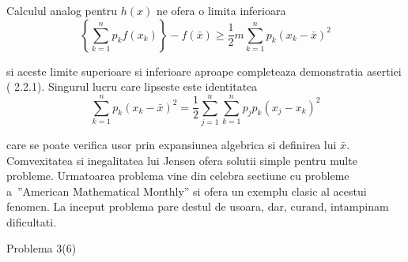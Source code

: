 \documentclass[a4paper,12pt,oneside]{report}
\begin{document}
	Calculul analog pentru  \(h\left ( x \right )\) ne ofera o limita inferioara 
\begin{displaymath}
  \left \{ \sum_{k = 1}^{n} p_{k}f\left ( x_{k} \right )\right \} - f\left (\bar{x}  \right )\geq \frac{1}{2}m\sum_{k = 1}^{n}p_{k}\left ( x_{k} - \bar{x} \right )^{2}
\end{displaymath}

si aceste limite superioare si inferioare aproape completeaza demonstratia asertiei ( 2.2.1). Singurul lucru care lipseste este identitatea 
\begin{displaymath}
  \sum_{k = 1}^{n}p_{k}\left ( x_{k} - \bar{x} \right )^{2} = \frac{1}{2}\sum_{j = 1}^{n}\sum_{k = 1}^{n} p _{j}p_{k}\left ( x_{j} - x_{k} \right )^{2}
\end{displaymath}

care se poate verifica usor prin expansiunea algebrica si definirea lui \(\bar{x}\). 
	Comvexitatea si inegalitatea lui Jensen ofera solutii simple pentru multe probleme.  
	Urmatoarea problema vine din celebra sectiune cu probleme a ”American Mathematical Monthly” si ofera un exemplu clasic al acestui fenomen. 
	La inceput problema pare destul de usoara, dar, curand, intampinam dificultati. 

Problema 3(6)



\setlength{\baselineskip}{\normalbaselineskip}
\setlength{\parskip}{0pt}

\end{document}
